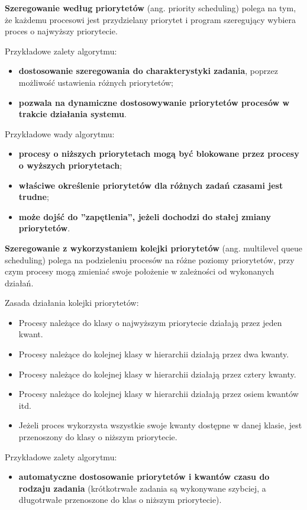 \documentclass{article}
\begin{document}
\textbf{Szeregowanie według priorytetów} (ang. priority scheduling) polega na tym, że każdemu procesowi jest przydzielany priorytet i program szeregujący wybiera proces o najwyższy priorytecie.

Przykładowe zalety algorytmu:
\begin{itemize}
    \item \textbf{dostosowanie szeregowania do charakterystyki zadania}, poprzez możliwość ustawienia różnych priorytetów;
    \item \textbf{pozwala na dynamiczne dostosowywanie priorytetów procesów w trakcie działania systemu}.
\end{itemize}

Przykładowe wady algorytmu:
\begin{itemize}
    \item \textbf{procesy o niższych priorytetach mogą być blokowane przez procesy o wyższych priorytetach};
    \item \textbf{właściwe określenie priorytetów dla różnych zadań czasami jest trudne};
    \item \textbf{może dojść do ”zapętlenia”, jeżeli dochodzi do stałej zmiany priorytetów}.
\end{itemize}

\textbf{Szeregowanie z wykorzystaniem kolejki priorytetów} (ang. multilevel queue scheduling) polega na podzieleniu procesów na różne poziomy priorytetów, przy czym procesy mogą zmieniać swoje położenie w zależności od wykonanych działań.

Zasada działania kolejki priorytetów:
\begin{itemize}
    \item Procesy należące do klasy o najwyższym priorytecie działają przez jeden kwant.
    \item Procesy należące do kolejnej klasy w hierarchii działają przez dwa kwanty.
    \item Procesy należące do kolejnej klasy w hierarchii działają przez cztery kwanty.
    \item Procesy należące do kolejnej klasy w hierarchii działają przez osiem kwantów itd.
    \item Jeżeli proces wykorzysta wszystkie swoje kwanty dostępne w danej klasie, jest przenoszony do klasy o niższym priorytecie.
\end{itemize}

Przykładowe zalety algorytmu:
\begin{itemize}
    \item \textbf{automatyczne dostosowanie priorytetów i kwantów czasu do rodzaju zadania} (krótkotrwałe zadania są wykonywane szybciej, a długotrwałe przenoszone do klas o niższym priorytecie).
\end{itemize}
\end{document}
